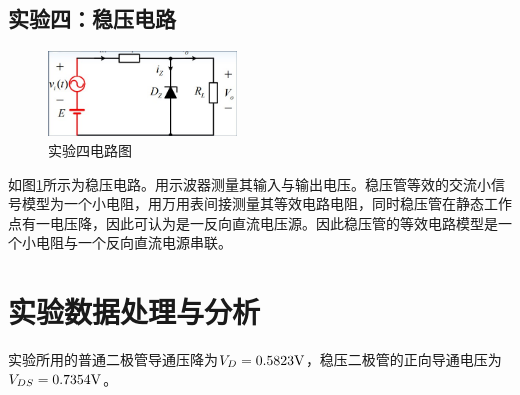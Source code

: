 \documentclass[a4paper,11pt,UTF8]{ctexart}
\begin{document}
\subsection{实验四：稳压电路}
\begin{figure}[H]
 \centering
 \includegraphics[width=5cm]{Exp4}
 \caption{实验四电路图}
 \label{fig:Exp4}
\end{figure}
如图\ref{fig:Exp4}所示为稳压电路。用示波器测量其输入与输出电压。稳压管等效的交流小信号模型为一个小电阻，用万用表间接测量其等效电路电阻，同时稳压管在静态工作点有一电压降，因此可认为是一反向直流电压源。因此稳压管的等效电路模型是一个小电阻与一个反向直流电源串联。

\section{实验数据处理与分析}
实验所用的普通二极管导通压降为$V_D=0.5823\mathrm{V}$，稳压二极管的正向导通电压为$V_{DS}=0.7354\mathrm{V}$。
\end{document}
